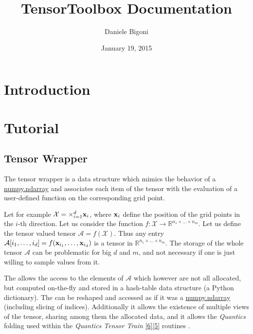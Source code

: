 \documentclass[a4paper,10pt,english]{sphinxmanual}
\title{TensorToolbox Documentation}
\date{January 19, 2015}
\author{Daniele Bigoni}
\begin{document}
\maketitle
\tableofcontents
{}\label{index::doc}



\chapter{Introduction}
\label{intro:introduction}\label{intro::doc}\label{intro:tensortoolbox-s-documentation}

\chapter{Tutorial}
\label{tutorial::doc}\label{tutorial:tutorial}

\section{Tensor Wrapper}
\label{tw:tensor-wrapper}\label{tw::doc}
The tensor wrapper is a data structure which mimics the behavior of a \href{http://docs.scipy.org/doc/numpy/index.html}{numpy.ndarray} and associates each item of the tensor with the evaluation of a user-defined function on the corresponding grid point.

Let for example \(\mathcal{X} = \times_{i=1}^d {\bf x}_i\), where \({\bf x}_i\) define the position of the grid points in the \(i\)-th direction. Let us consider the function \(f:\mathcal{X}\rightarrow \mathbb{R}^{n_1\times \ldots \times n_m}\). Let us define the tensor valued tensor \(\mathcal{A}=f(\mathcal{X})\). Thus any entry \(\mathcal{A}[i_1,\ldots,i_d] = f({\bf x}_{i_1},\ldots,{\bf x}_{i_d})\) is a tensor in \(\mathbb{R}^{n_1\times \ldots \times n_m}\). The storage of the whole tensor \(\mathcal{A}\) can be problematic for big \(d\) and \(m\), and not necessary if one is just willing to sample values from it.

The  allows the access to the elements of \(\mathcal{A}\) which however are not all allocated, but computed on-the-fly and stored in a hash-table data structure (a Python dictionary). The  can be reshaped and accessed as if it was a \href{http://docs.scipy.org/doc/numpy/index.html}{numpy.ndarray} (including slicing of indices). Additionally it allows the existence of multiple views of the tensor, sharing among them the allocated data, and it allows the \emph{Quantics} folding used within the \emph{Quantics Tensor Train} {\hyperref[zrefs:khoromskij2011]{{[}6{]}}}{\hyperref[zrefs:khoromskij2010]{{[}5{]}}} routines .
\end{document}
